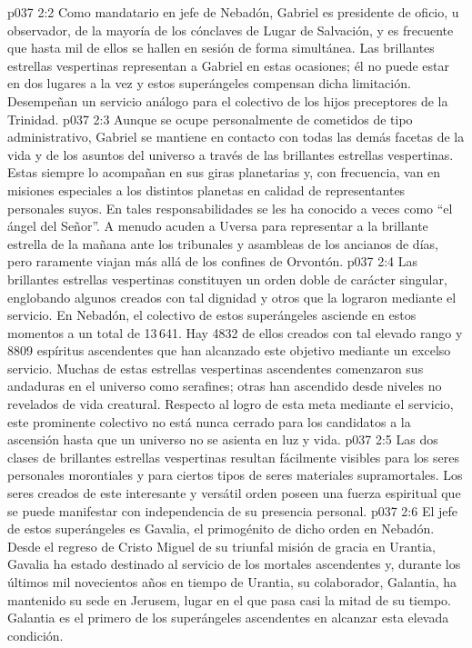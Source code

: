\vs p037 2:2 Como mandatario en jefe de Nebadón, Gabriel es presidente de oficio, u observador, de la mayoría de los cónclaves de Lugar de Salvación, y es frecuente que hasta mil de ellos se hallen en sesión de forma simultánea. Las brillantes estrellas vespertinas representan a Gabriel en estas ocasiones; él no puede estar en dos lugares a la vez y estos superángeles compensan dicha limitación. Desempeñan un servicio análogo para el colectivo de los hijos preceptores de la Trinidad.
\vs p037 2:3 Aunque se ocupe personalmente de cometidos de tipo administrativo, Gabriel se mantiene en contacto con todas las demás facetas de la vida y de los asuntos del universo a través de las brillantes estrellas vespertinas. Estas siempre lo acompañan en sus giras planetarias y, con frecuencia, van en misiones especiales a los distintos planetas en calidad de representantes personales suyos. En tales responsabilidades se les ha conocido a veces como “el ángel del Señor”. A menudo acuden a Uversa para representar a la brillante estrella de la mañana ante los tribunales y asambleas de los ancianos de días, pero raramente viajan más allá de los confines de Orvontón.
\vs p037 2:4 \pc Las brillantes estrellas vespertinas constituyen un orden doble de carácter singular, englobando algunos creados con tal dignidad y otros que la lograron mediante el servicio. En Nebadón, el colectivo de estos superángeles asciende en estos momentos a un total de 13\,641. Hay 4832 de ellos creados con tal elevado rango y 8809 espíritus ascendentes que han alcanzado este objetivo mediante un excelso servicio. Muchas de estas estrellas vespertinas ascendentes comenzaron sus andaduras en el universo como serafines; otras han ascendido desde niveles no revelados de vida creatural. Respecto al logro de esta meta mediante el servicio, este prominente colectivo no está nunca cerrado para los candidatos a la ascensión hasta que un universo no se asienta en luz y vida.
\vs p037 2:5 Las dos clases de brillantes estrellas vespertinas resultan fácilmente visibles para los seres personales morontiales y para ciertos tipos de seres materiales supramortales. Los seres creados de este interesante y versátil orden poseen una fuerza espiritual que se puede manifestar con independencia de su presencia personal.
\vs p037 2:6 \pc El jefe de estos superángeles es Gavalia, el primogénito de dicho orden en Nebadón. Desde el regreso de Cristo Miguel de su triunfal misión de gracia en Urantia, Gavalia ha estado destinado al servicio de los mortales ascendentes y, durante los últimos mil novecientos años en tiempo de Urantia, su colaborador, Galantia, ha mantenido su sede en Jerusem, lugar en el que pasa casi la mitad de su tiempo. Galantia es el primero de los superángeles ascendentes en alcanzar esta elevada condición.
